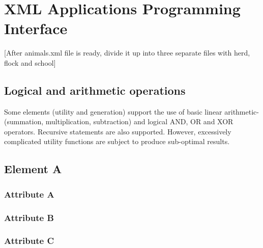 \documentclass[]{article}
\begin{document}
\newpage
\section{XML Applications Programming Interface}




[After animals.xml file is ready, divide it up into three separate files with herd, flock and school]

\subsection{Logical and arithmetic operations}

Some elements (utility and generation) support the use of basic linear arithmetic- (summation, multiplication, subtraction) and logical AND, OR and XOR operators. Recursive statements are also supported. However, excessively complicated utility functions are subject to produce sub-optimal results.

\subsection{Element A}

\subsubsection{Attribute A}

\subsubsection{Attribute B}

\subsubsection{Attribute C}
\end{document}
